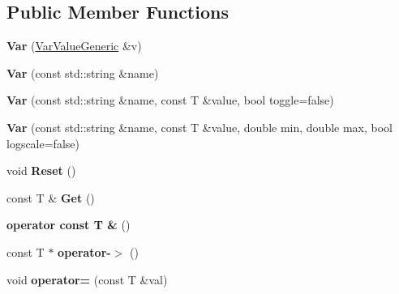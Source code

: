 \subsection*{Public Member Functions}
\begin{DoxyCompactItemize}
\item 
{\bfseries Var} (\hyperlink{classpangolin_1_1_var_value_generic}{Var\+Value\+Generic} \&v)\hypertarget{classpangolin_1_1_var_aef05c02cdfa656eb66f7d111c4d6e398}{}\label{classpangolin_1_1_var_aef05c02cdfa656eb66f7d111c4d6e398}

\item 
{\bfseries Var} (const std\+::string \&name)\hypertarget{classpangolin_1_1_var_af933d913b9a26a1c826c459238419e45}{}\label{classpangolin_1_1_var_af933d913b9a26a1c826c459238419e45}

\item 
{\bfseries Var} (const std\+::string \&name, const T \&value, bool toggle=false)\hypertarget{classpangolin_1_1_var_ac5baae380efb22a80ada9b08263629dd}{}\label{classpangolin_1_1_var_ac5baae380efb22a80ada9b08263629dd}

\item 
{\bfseries Var} (const std\+::string \&name, const T \&value, double min, double max, bool logscale=false)\hypertarget{classpangolin_1_1_var_a6b0fa35641988e3a73c0c637779021e9}{}\label{classpangolin_1_1_var_a6b0fa35641988e3a73c0c637779021e9}

\item 
void {\bfseries Reset} ()\hypertarget{classpangolin_1_1_var_a9451def521ef050d504de505c0873181}{}\label{classpangolin_1_1_var_a9451def521ef050d504de505c0873181}

\item 
const T \& {\bfseries Get} ()\hypertarget{classpangolin_1_1_var_a842d2c0de45c54d0e28cf4d4a2d3750d}{}\label{classpangolin_1_1_var_a842d2c0de45c54d0e28cf4d4a2d3750d}

\item 
{\bfseries operator const T \&} ()\hypertarget{classpangolin_1_1_var_aab2a781db067c25a9dbc1d43eb0437df}{}\label{classpangolin_1_1_var_aab2a781db067c25a9dbc1d43eb0437df}

\item 
const T $\ast$ {\bfseries operator-\/$>$} ()\hypertarget{classpangolin_1_1_var_aa3a881d3345d70f8c22eb5f418e21650}{}\label{classpangolin_1_1_var_aa3a881d3345d70f8c22eb5f418e21650}

\item 
void {\bfseries operator=} (const T \&val)\hypertarget{classpangolin_1_1_var_a4c14268bb925bfaacf1c8ac338b8d170}{}\label{classpangolin_1_1_var_a4c14268bb925bfaacf1c8ac338b8d170}


\end{DoxyCompactItemize}

